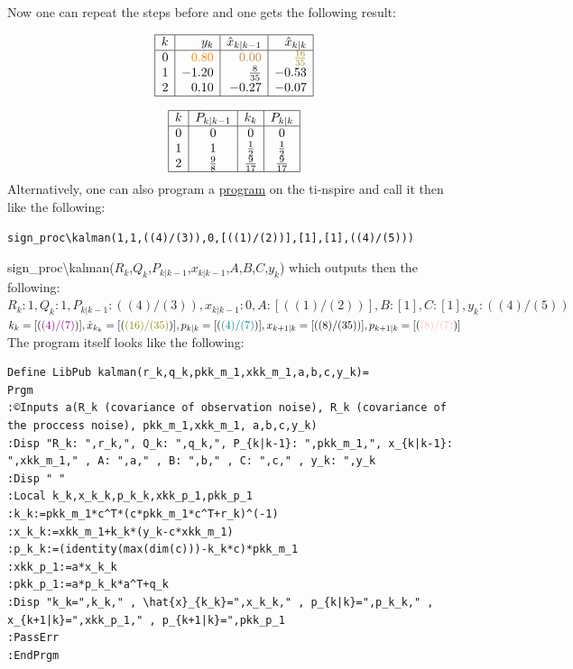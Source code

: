 Now one can repeat the steps before and one gets the following result:

$$
\begin{array}{|r|r|r|r|}
\hline k & y_k & \hat{x}_{k \mid k-1} & \hat{x}_{k \mid k} \\
\hline 0 & \textcolor{orange}{0.80} & \textcolor{brown}{0.00} & \textcolor{olive}{\frac{16}{35}} \\
1 & -1.20 & \frac{8}{35} & -0.53 \\
2 & 0.10 & -0.27 & -0.07 \\
\hline
\end{array}
$$

$$
\begin{array}{|c|c|c|c|}
\hline k & P_{k \mid k-1} & k_k & P_{k \mid k} \\
\hline 0 & 0 & 0 & 0 \\
1 & 1 & \frac{1}{2} & \frac{1}{2} \\
2 & \frac{9}{8} & \frac{9}{17} & \frac{9}{17} \\
\hline
\end{array}
$$
Alternatively, one can also program a \href{https://youtu.be/x0-NaGaCzew}{program} on the ti-nspire and call it then like the following:
\begin{verbatim}
sign_proc\kalman(1,1,((4)/(3)),0,[((1)/(2))],[1],[1],((4)/(5)))
\end{verbatim}
sign\_proc\textbackslash kalman($R_k$,$Q_k$,$P_{k|k-1}$,$x_{k|k-1}$,$A$,$B$,$C$,$y_k$)\newline
which outputs then the following:\newline
$R_k: 1 , Q_k: 1 , P_{k|k-1}: ((4)/(3)) , x_{k|k-1}: 0 , A: [((1)/(2))] , B: [1] , C: [1] , y_k: ((4)/(5))$
$k_k= [(\textcolor{violet}{(4)/(7)})] , \hat{x}_{k_k}= [(\textcolor{olive}{(16)/(35)})] , p_{k|k}= [(\textcolor{teal}{(4)/(7)})] , x_{k+1|k}= [((8)/(35))] , p_{k+1|k}= [(\textcolor{pink}{(8)/(7)})]$\newline
The program itself looks like the following:
\begin{verbatim}
Define LibPub kalman(r_k,q_k,pkk_m_1,xkk_m_1,a,b,c,y_k)=
Prgm
:©Inputs a(R_k (covariance of observation noise), R_k (covariance of the proccess noise), pkk_m_1,xkk_m_1, a,b,c,y_k)
:Disp "R_k: ",r_k,", Q_k: ",q_k,", P_{k|k-1}: ",pkk_m_1,", x_{k|k-1}: ",xkk_m_1," , A: ",a," , B: ",b," , C: ",c," , y_k: ",y_k
:Disp " "
:Local k_k,x_k_k,p_k_k,xkk_p_1,pkk_p_1
:k_k:=pkk_m_1*c^T*(c*pkk_m_1*c^T+r_k)^(-1)
:x_k_k:=xkk_m_1+k_k*(y_k-c*xkk_m_1)
:p_k_k:=(identity(max(dim(c)))-k_k*c)*pkk_m_1
:xkk_p_1:=a*x_k_k
:pkk_p_1:=a*p_k_k*a^T+q_k
:Disp "k_k=",k_k," , \hat{x}_{k_k}=",x_k_k," , p_{k|k}=",p_k_k," , x_{k+1|k}=",xkk_p_1," , p_{k+1|k}=",pkk_p_1
:PassErr
:EndPrgm
\end{verbatim}

